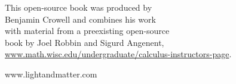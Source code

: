 \thispagestyle{empty}

\vspace{100mm}

{\sffamily


\vspace{10mm}

\noindent 
  This open-source book was produced by \\
  Benjamin Crowell and
  combines his work \\
  with material from a
  preexisting open-source\\
  book by Joel Robbin 
  and Sigurd Angenent,\\
  \url{www.math.wisc.edu/undergraduate/calculus-instructors-page}.

\vspace{10mm}

\noindent www.lightandmatter.com

}

